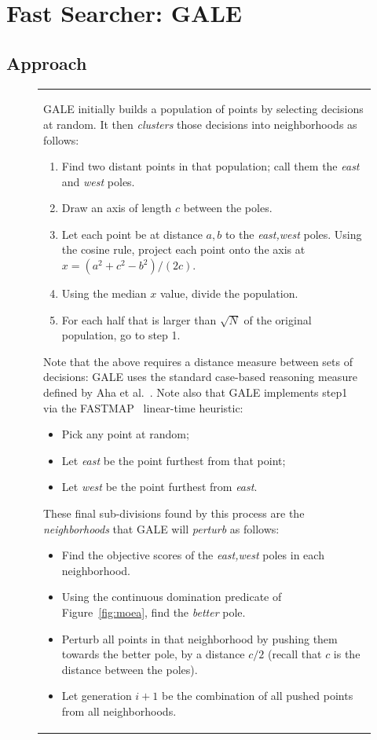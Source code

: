 \documentclass{sig-alternative}
\newcommand{\fig}[1]{Figure~\ref{fig:#1}}
\begin{document}
\section{Fast Searcher: GALE}
\subsection{Approach}
\begin{figure}[!b]
\small
\begin{tabular}{|p{.95\linewidth}|}\hline
GALE initially builds a population of points by selecting decisions at random. It then {\em clusters} those decisions into neighborhoods as follows:
\begin{enumerate}
\item Find two distant points in that population; call them the {\em east} and {\em west} poles. 
\item Draw an axis of length $c$ between the poles. 
\item Let each point be at distance $a,b$ to the {\em east,west} poles.  Using the cosine rule, project each point onto the  axis  at $x=(a^2 + c^2 - b^2)/(2c)$.  
\item Using the median $x$ value, divide the population.
\item For each half that is larger than $\sqrt{N}$ of the original population, go to step 1.
\end{enumerate}

Note that the above requires a distance measure between sets of decisions: GALE uses the standard case-based reasoning measure defined by Aha et al.~\cite{aha91}. Note also that GALE implements step1 via  the FASTMAP~\cite{Faloutsos1995} linear-time
heuristic:
\begin{itemize}
\item Pick any point at random; 
\item Let {\em east} be the point furthest from that point; 
\item Let {\em west} be the point furthest from {\em east}.
\end{itemize}

These final sub-divisions found by this process are the {\em neighborhoods} that GALE will {\em perturb} as follows:
\begin{itemize}
\item Find the objective scores of the {\em east,west} poles in each neighborhood.
\item Using the continuous domination predicate of \fig{moea}, find  the {\em better} pole. 
\item Perturb all points in that neighborhood by pushing them towards the better pole, by a distance  $c/2$ (recall that  $c$ is the distance between the poles).
\item Let generation $i+1$ be the combination of all pushed points from all neighborhoods.
\end{itemize}


\end{tabular}
\end{figure}
\end{document}
